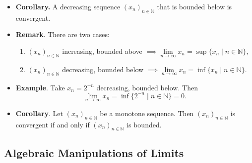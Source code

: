 \documentclass{article}
\newcommand{\N}{\mathbb{N}}
\newcommand{\seq}[2]{(#1_{#2})_{#2 \in \N}}
\newcommand{\set}[2]{\{ #1 \mid #2 \}}
\newcommand{\?}{\stackrel{?}{=}}
\begin{document}
\begin{itemize}
\begin{proof}
\begin{align*}
            |x_n - x| &= x - x_n \\
            &\leq x - x_{n_\varepsilon} \leq \varepsilon
        \end{align*}
        with $x_{n_\varepsilon} \leq x_n$ and $n \geq n_\varepsilon$ ($\seq{x}{n}$ increasing) and for all $\varepsilon > 0$, take $N(\varepsilon) = n_\varepsilon$.
    \end{proof}
    \item \textbf{Corollary.} A decreasing sequence $\seq{x}{n}$ that is bounded below is convergent.
    \item \textbf{Remark}. There are two cases:
    \begin{enumerate}[label=(\roman*)]
        \item $\seq{x}{n}$ increasing, bounded above $\implies \lim\limits_{n \to \infty} x_n = \sup \set{x_n}{n \in \N}$,
        \item $\seq{x}{n}$ decreasing, bounded below $\implies \lim\limits_{n \to \infty} x_n = \inf \set{x_n}{n \in \N}$.
    \end{enumerate}
    \item \textbf{Example}. Take $x_n = 2^{-n}$ decreasing, bounded below. Then
    $$\lim\limits_{n \to \infty} x_n = \inf\set{2^{-n}}{ n \in \N} = 0.$$
    \item \textbf{Corollary}. Let $\seq{x}{n}$ be a monotone sequence. Then $\seq{x}{n}$ is convergent if and only if $\seq{x}{n}$ is bounded.
\end{itemize}

\subsection{Algebraic Manipulations of Limits}
\end{document}

